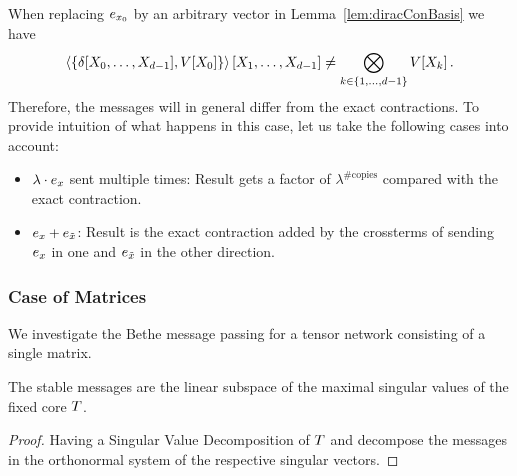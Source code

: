 When replacing $e_{x_{0}}$ by an arbitrary vector in Lemma~\ref{lem:diracConBasis} we have
	\[ \left\langle \left\{\delta[X_{0},\ldots,X_{d-1}], V[X_{0}]\right\}\right\rangle \left[ X_{1},\ldots,X_{d-1} \right] 
		\neq \bigotimes_{k\in\{1,\ldots,d-1\}} V[{X_{k}}]  \, . \]
Therefore, the messages will in general differ from the exact contractions.
To provide intuition of what happens in this case, let us take the following cases into account:
\begin{itemize}
	\item $\lambda\cdot e_{x}$ sent multiple times: Result gets a factor of $\lambda^{\# \text{copies}}$ compared with the exact contraction.
	\item $e_{x}+e_{\tilde{x}}$: Result is the exact contraction added by the crossterms of sending $e_{x}$ in one and $e_{\tilde{x}}$ in the other direction.
\end{itemize}	



\subsubsection{Case of Matrices}


We investigate the Bethe message passing for a tensor network consisting of a single matrix.

\begin{theorem}
	The stable messages are the linear subspace of the maximal singular values of the fixed core $T$.
\end{theorem}
\begin{proof}
	Having a Singular Value Decomposition of $T$ and decompose the messages in the orthonormal system of the respective singular vectors.
\end{proof}


